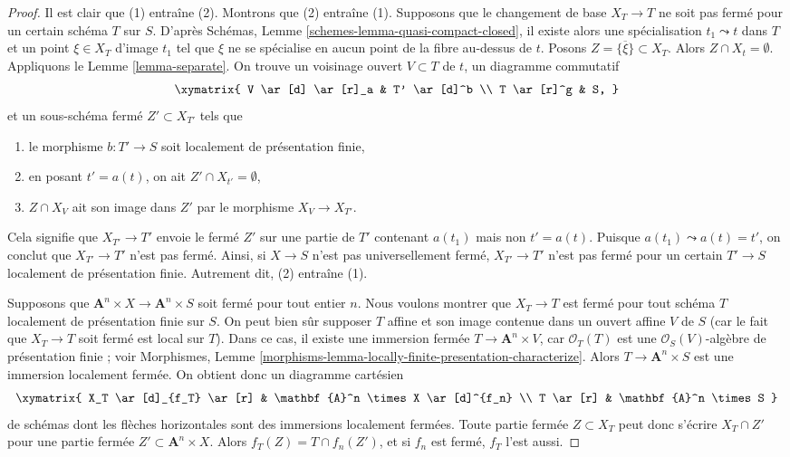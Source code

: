 \begin{proof}
Il est clair que (1) entraîne (2). Montrons que (2) entraîne (1).
Supposons que le changement de base $X_T \to T$ ne soit pas fermé pour un certain
schéma $T$ sur $S$. D'après
Schémas, Lemme \ref{schemes-lemma-quasi-compact-closed},
il existe alors une spécialisation $t_1 \leadsto t$ dans
$T$ et un point $\xi \in X_T$ d'image $t_1$ tel que $\xi$ ne
se spécialise en aucun point de la fibre au-dessus de $t$. Posons
$Z = \overline{\{\xi\}} \subset X_T$. Alors $Z \cap X_t = \emptyset$. Appliquons le
Lemme \ref{lemma-separate}.
On trouve un voisinage ouvert $V \subset T$ de $t$, un diagramme commutatif
$$
\xymatrix{
V \ar[d] \ar[r]_a & T' \ar[d]^b \\
T \ar[r]^g & S,
}
$$
et un sous-schéma fermé $Z' \subset X_{T'}$ tels que
\begin{enumerate}
\item le morphisme $b : T' \to S$ soit localement de présentation finie,
\item en posant $t' = a(t)$, on ait $Z' \cap X_{t'} = \emptyset$,
\item $Z \cap X_V$ ait son image dans $Z'$ par le morphisme $X_V \to X_{T'}$.
\end{enumerate}
Cela signifie que $X_{T'} \to T'$ envoie le fermé $Z'$
sur une partie de $T'$ contenant $a(t_1)$ mais non $t' = a(t)$.
Puisque $a(t_1) \leadsto a(t) = t'$, on conclut que $X_{T'} \to T'$
n'est pas fermé. Ainsi, si $X \to S$ n'est pas universellement fermé,
$X_{T'} \to T'$ n'est pas fermé pour un certain $T' \to S$
localement de présentation finie. Autrement dit, (2)
entraîne (1).

\medskip\noindent
Supposons que $\mathbf{A}^n \times X \to \mathbf{A}^n \times S$ soit
fermé pour tout entier $n$. Nous voulons montrer que $X_T \to T$ est
fermé pour tout schéma $T$ localement de présentation finie
sur $S$. On peut bien sûr supposer $T$ affine et son image contenue dans
un ouvert affine $V$ de $S$ (car le fait que $X_T \to T$ soit fermé est local sur $T$).
Dans ce cas, il existe une immersion fermée $T \to \mathbf{A}^n \times V$,
car $\mathcal{O}_T(T)$ est une
$\mathcal{O}_S(V)$-algèbre de présentation finie ; voir
Morphismes,
Lemme \ref{morphisms-lemma-locally-finite-presentation-characterize}.
Alors $T \to \mathbf{A}^n \times S$ est une immersion localement fermée.
On obtient donc un diagramme cartésien
$$
\xymatrix{
X_T \ar[d]_{f_T} \ar[r] & \mathbf{A}^n \times X \ar[d]^{f_n} \\
T \ar[r] & \mathbf{A}^n \times S
}
$$
de schémas dont les flèches horizontales sont des immersions localement fermées.
Toute partie fermée $Z \subset X_T$ peut donc s'écrire
$X_T \cap Z'$ pour une partie fermée $Z' \subset \mathbf{A}^n \times X$.
Alors $f_T(Z) = T \cap f_n(Z')$, et si $f_n$ est fermé,
$f_T$ l'est aussi.
\end{proof}

